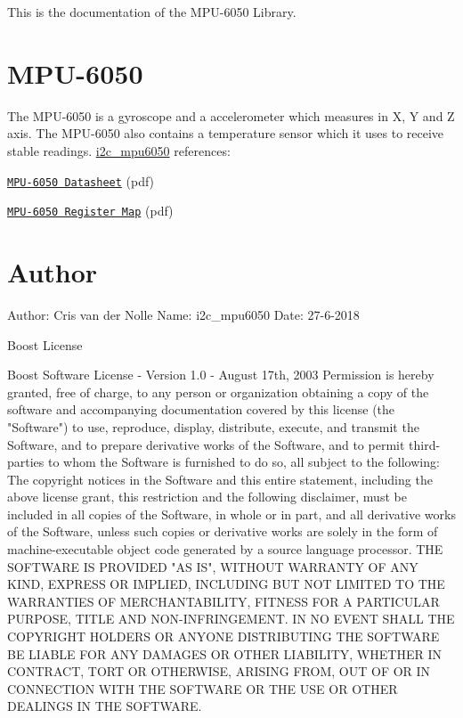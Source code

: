 This is the documentation of the M\+P\+U-\/6050 Library. \hypertarget{index_MPU-6050}{}\section{M\+P\+U-\/6050}\label{index_MPU-6050}
The M\+P\+U-\/6050 is a gyroscope and a accelerometer which measures in X, Y and Z axis. The M\+P\+U-\/6050 also contains a temperature sensor which it uses to receive stable readings. \mbox{\hyperlink{classi2c__mpu6050}{i2c\+\_\+mpu6050}}  references\+:
\begin{DoxyItemize}
\item \href{https://www.invensense.com/wp-content/uploads/2015/02/MPU-6000-Datasheet1.pdf}{\tt M\+P\+U-\/6050 Datasheet} (pdf)
\item \href{https://www.invensense.com/wp-content/uploads/2015/02/MPU-6000-Register-Map1.pdf}{\tt M\+P\+U-\/6050 Register Map} (pdf) 
\end{DoxyItemize}\hypertarget{index_Boost}{}\section{Author}\label{index_Boost}
\begin{DoxyVerb}Author: Cris van der Nolle
Name: i2c_mpu6050
Date: 27-6-2018
\end{DoxyVerb}
  Boost License \begin{DoxyVerb}Boost Software License - Version 1.0 - August 17th, 2003
Permission is hereby granted, free of charge, to any person or organization
obtaining a copy of the software and accompanying documentation covered by
this license (the "Software") to use, reproduce, display, distribute,
execute, and transmit the Software, and to prepare derivative works of the
Software, and to permit third-parties to whom the Software is furnished to
do so, all subject to the following:
The copyright notices in the Software and this entire statement, including
the above license grant, this restriction and the following disclaimer,
must be included in all copies of the Software, in whole or in part, and
all derivative works of the Software, unless such copies or derivative
works are solely in the form of machine-executable object code generated by
a source language processor.
THE SOFTWARE IS PROVIDED "AS IS", WITHOUT WARRANTY OF ANY KIND, EXPRESS OR
IMPLIED, INCLUDING BUT NOT LIMITED TO THE WARRANTIES OF MERCHANTABILITY,
FITNESS FOR A PARTICULAR PURPOSE, TITLE AND NON-INFRINGEMENT. IN NO EVENT
SHALL THE COPYRIGHT HOLDERS OR ANYONE DISTRIBUTING THE SOFTWARE BE LIABLE
FOR ANY DAMAGES OR OTHER LIABILITY, WHETHER IN CONTRACT, TORT OR OTHERWISE,
ARISING FROM, OUT OF OR IN CONNECTION WITH THE SOFTWARE OR THE USE OR OTHER
DEALINGS IN THE SOFTWARE.  \end{DoxyVerb}
 